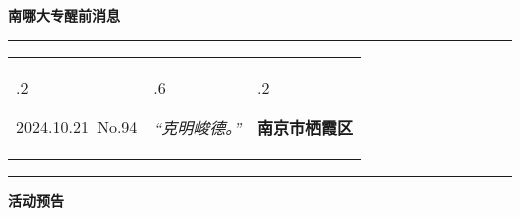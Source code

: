 \documentclass[letterpaper, 12pt]{article}
\begin{document}
\begin{center}
    \Huge\textbf{南哪大专醒前消息}
\end{center}
\vspace{4mm}
\hrule
\renewcommand\tabularxcolumn[1]{m{#1}}
\begin{tabularx}{\textwidth}{>{\hsize.2\hsize}X>{\hsize.6\hsize}X>{\hsize.2\hsize}X}
    \begin{flushleft}
        2024.10.21\, No.94
    \end{flushleft}
    &
    \begin{center}
        \textit{“克明峻德。”}
    \end{center}
    &
    \begin{flushright}
        \textbf{南京市栖霞区}
    \end{flushright}
\end{tabularx}
\vspace{-3.5mm}
\hrule
\vspace{4mm}
\centerline{\huge\textbf{活动预告}}
\end{document}
